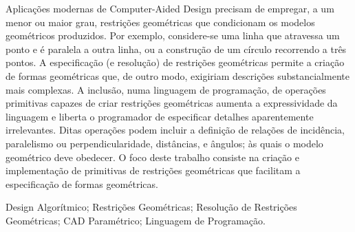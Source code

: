 \begin{pt}
\begin{resumo}
Aplicações modernas de Computer-Aided Design precisam de empregar, a um menor ou
maior grau, restrições geométricas que condicionam os modelos geométricos
produzidos.  Por exemplo, considere-se uma linha que atravessa um ponto e é
paralela a outra linha, ou a construção de um círculo recorrendo a três pontos.
A especificação (e resolução) de restrições geométricas permite a criação de
formas geométricas que, de outro modo, exigiriam descrições substancialmente
mais complexas.  A inclusão, numa linguagem de programação, de operações
primitivas capazes de criar restrições geométricas aumenta a expressividade da
linguagem e liberta o programador de especificar detalhes aparentemente
irrelevantes.  Ditas operações podem incluir a definição de relações de
incidência, paralelismo ou perpendicularidade, distâncias, e ângulos; às quais o
modelo geométrico deve obedecer.  O foco deste trabalho consiste na criação e
implementação de primitivas de restrições geométricas que facilitam a
especificação de formas geométricas.
\end{resumo}

\begin{palavraschave}
\noindent
Design Algorítmico;
Restrições Geométricas;
Resolução de Restrições Geométricas;
CAD Paramétrico;
Linguagem de Programação.
\end{palavraschave}
\end{pt}

\clearpage
\thispagestyle{empty}
